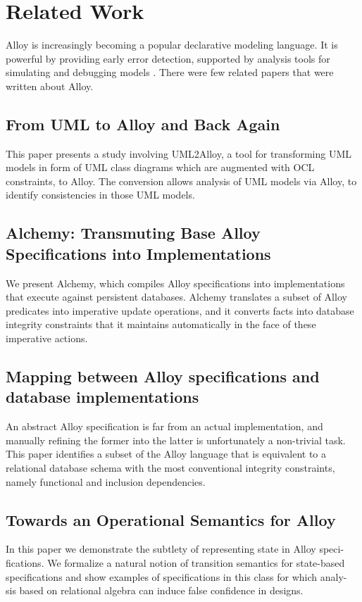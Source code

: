\documentclass[oneside]{book}
\begin{document}
\newpage

\chapter{Related Work}

Alloy is increasingly becoming a popular declarative modeling language. It is powerful by providing early error detection, supported by analysis tools for simulating and debugging models \cite{lightning}. There were few related papers that were written about Alloy.

\section{From UML to Alloy and Back Again}
This paper presents a study involving UML2Alloy, a tool for transforming
UML models in form of UML class diagrams which are augmented with
OCL constraints, to Alloy. The conversion allows analysis of UML models
via Alloy, to identify consistencies in those UML models.

\section{Alchemy: Transmuting Base Alloy Specifications into Implementations}
We present Alchemy, which compiles Alloy specifications into implementations that execute against persistent databases. Alchemy translates a subset of Alloy predicates into imperative update operations, and it converts facts into database integrity constraints that it maintains automatically in the face of these imperative actions.

\section{Mapping between Alloy specifications and database implementations}
An abstract Alloy specification is far from an actual implementation, and manually refining the former into the latter is unfortunately a non-trivial task. This paper identifies a subset of the Alloy language that is equivalent to a relational database schema with the most conventional integrity constraints, namely functional and inclusion dependencies.

\section{Towards an Operational Semantics for Alloy}
In this paper we demonstrate the subtlety of representing state in Alloy speci- fications. We formalize a natural notion of transition semantics for state-based specifications and show examples of specifications in this class for which analy- sis based on relational algebra can induce false confidence in designs.
\end{document}
